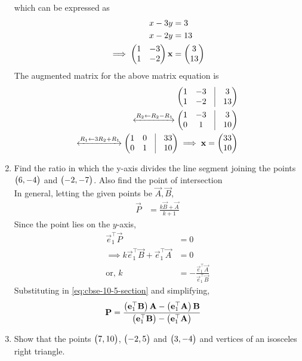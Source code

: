 \documentclass[journal,12pt,twocolumn]{IEEEtran}
\begin{document}
\begin{enumerate}
		    which can be expressed as 
		    \begin{align}
			    x  -3y &= 3
			    \\
			    x -2y  &= 13
			    \\
			    \implies 
			    \begin{pmatrix}1 &  -3
			    \\
			    1 & -2\end{pmatrix}\mathbf{x} &= \begin{pmatrix}3 \\ 13\end{pmatrix}
		    \end{align}
		    The augmented matrix for the above matrix equation is 
		    \begin{align}
			    \myvec{
				    1 & -3 & \vrule & 3
			    \\
			    1 & -2  &\vrule & 13
		    }
		    \\
		    \xleftrightarrow[]{R_2 \leftarrow R_2 -R_1 }
			    \myvec{
				    1 & -3 & \vrule & 3
			    \\
			    0 & 1  &\vrule & 10
		    }
		    \\
		    \xleftrightarrow[]{R_1 \leftarrow 3R_2 +R_1 }
			    \myvec{
				    1 & 0 & \vrule & 33
			    \\
			    0 & 1  &\vrule & 10
		    }
			    \implies \vec{x} = \myvec{33 \\ 10}
		    \end{align}
        \item Find the ratio in which the y-axis divides the line segment joining the points $\begin{pmatrix}6, -4\end{pmatrix}$ and $\begin{pmatrix}-2, -7\end{pmatrix}$. Also find the point of intersection\\
\solution  In general, letting the given points be $\vec{A}, \vec{B}$, 
		\begin{align}
			\vec{P} &= \frac{k\vec{B}+ \vec{A} }{k+1}
			\label{eq:cbse-10-5-section}
		\end{align}
		Since the point lies on the $y$-axis, 
		\begin{align}
			\vec{e}_1^{\top}\vec{P} &= 0
			\\
			\implies k\vec{e}_1^{\top}\vec{B}+ \vec{e}_1^{\top}\vec{A} &=0
			\\
			\text{or, } k &=- \frac{\vec{e}_1^{\top}\vec{A}}{\vec{e}_1^{\top}\vec{B}}
		\end{align}
Substituting in 			\eqref{eq:cbse-10-5-section} and simplifying, 
		\begin{align}
			\mathbf{P} &= \frac{\left(\mathbf{e}_1^{\top}\mathbf{B}\right)\mathbf{A}- \left(\mathbf{e}_1^{\top}\mathbf{A}\right)\mathbf{B} }{\left(\mathbf{e}_1^{\top}\mathbf{B}\right)-\left(\mathbf{e}_1^{\top}\mathbf{A}\right)}
		\end{align}
        \item Show that the points $\begin{pmatrix}7, 10\end{pmatrix}$, $\begin{pmatrix}-2,5\end{pmatrix}$ and $\begin{pmatrix}3, -4\end{pmatrix}$ and vertices of an isosceles right triangle.

\end{enumerate}
\end{document}

